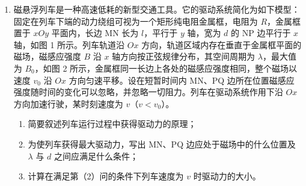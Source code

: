 \documentclass[\gkver]{gaokaozhenti}
\begin{document}
\begin{enumerate}
{（3）设绳断后 A 的速度为 $v_{A}$，取水平向右为正方向，有 $m_{B}v_{1}=m_{B}v_{B}+m_{A}v_{A}$，$W=\frac{1}{2}m_{A}v_{A}^{2}$，代入数据得 $W=8\UJ$。
}

\item
磁悬浮列车是一种高速低耗的新型交通工具。它的驱动系统简化为如下模型：固定在列车下端的动力绕组可视为一个矩形纯电阻金属框，电阻为 $R$，金属框置于 $xOy$ 平面内，长边 MN 长为 $l$，平行于 $y$ 轴，宽为 $d$ 的 NP 边平行于 $x$ 轴，如图 1 所示。列车轨道沿 $Ox$ 方向，轨道区域内存在垂直于金属框平面的磁场，磁感应强度 $B$ 沿 $x$ 轴方向按正弦规律分布，其空间周期为 $\lambda$，最大值为 $B_{0}$，如图 2 所示，金属框同一长边上各处的磁感应强度相同，整个磁场以速度 $v_{0}$ 沿 $Ox$ 方向匀速平移。设在短暂时间内 MN、PQ 边所在位置磁感应强度随时间的变化可以忽略，并忽略一切阻力。列车在驱动系统作用下沿 $Ox$ 方向加速行驶，某时刻速度为 $v$（$v<v_{0}$）。

\begin{enumerate}
	\item
	简要叙述列车运行过程中获得驱动力的原理；
	\item
	为使列车获得最大驱动力，写出 MN、PQ 边应处于磁场中的什么位置及 $\lambda$ 与 $d$ 之间应满足什么条件；
	\item
	计算在满足第（2）问的条件下列车速度为 $v$ 时驱动力的大小。
\end{enumerate}




\end{enumerate}
\end{document}

